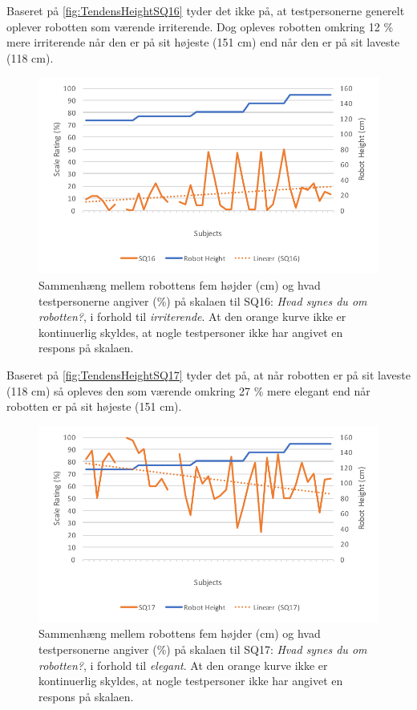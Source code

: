 \noindent
%
Baseret på \autoref{fig:TendensHeightSQ16} tyder det ikke på, at testpersonerne generelt oplever robotten som værende irriterende. Dog opleves robotten omkring 12 \% mere irriterende når den er på sit højeste (151 cm) end når den er på sit laveste (118 cm). 
%
\begin{figure}[H]
\centering
\includegraphics[width=\textwidth]{Figure/DatabehandlingSkalaer/TendensHeight/HeightSQ16}
\caption{Sammenhæng mellem robottens fem højder (cm) og hvad testpersonerne angiver (\%) på skalaen til SQ16: \textit{Hvad synes du om robotten?}, i forhold til \textit{irriterende}. At den orange kurve ikke er kontinuerlig skyldes, at nogle testpersoner ikke har angivet en respons på skalaen.}
\label{fig:TendensHeightSQ16}
\end{figure}
\noindent
%
Baseret på \autoref{fig:TendensHeightSQ17} tyder det på, at når robotten er på sit laveste (118 cm) så opleves den som værende omkring 27 \% mere elegant end når robotten er på sit højeste (151 cm).
\begin{figure}[H]
\centering
\includegraphics[width=\textwidth]{Figure/DatabehandlingSkalaer/TendensHeight/HeightSQ17}
\caption{Sammenhæng mellem robottens fem højder (cm) og hvad testpersonerne angiver (\%) på skalaen til SQ17: \textit{Hvad synes du om robotten?}, i forhold til \textit{elegant}. At den orange kurve ikke er kontinuerlig skyldes, at nogle testpersoner ikke har angivet en respons på skalaen.}
\label{fig:TendensHeightSQ17}
\end{figure}

